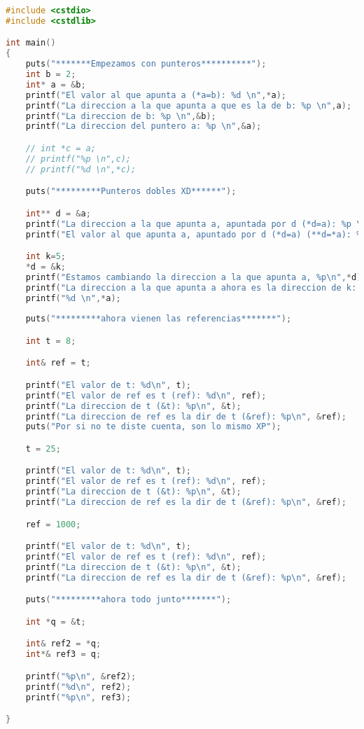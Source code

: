 \begin{lstlisting}[language=C++, caption={Examples ref and pointers}]
#include <cstdio>
#include <cstdlib>

int main()
{
    puts("*******Empezamos con punteros**********");
    int b = 2;
    int* a = &b;
    printf("El valor al que apunta a (*a=b): %d \n",*a);
    printf("La direccion a la que apunta a que es la de b: %p \n",a);
    printf("La direccion de b: %p \n",&b);
    printf("La direccion del puntero a: %p \n",&a);

    // int *c = a;
    // printf("%p \n",c);
    // printf("%d \n",*c);

    puts("*********Punteros dobles XD******");

    int** d = &a;
    printf("La direccion a la que apunta a, apuntada por d (*d=a): %p \n",*d);
    printf("El valor al que apunta a, apuntado por d (*d=a) (**d=*a): %d \n",**d);

    int k=5;
    *d = &k;
    printf("Estamos cambiando la direccion a la que apunta a, %p\n",*d);
    printf("La direccion a la que apunta a ahora es la direccion de k:  %p \n",a);
    printf("%d \n",*a);
    
    puts("*********ahora vienen las referencias*******");

    int t = 8;

    int& ref = t;

    printf("El valor de t: %d\n", t);
    printf("El valor de ref es t (ref): %d\n", ref);
    printf("La direccion de t (&t): %p\n", &t);
    printf("La direccion de ref es la dir de t (&ref): %p\n", &ref);
    puts("Por si no te diste cuenta, son lo mismo XP");

    t = 25;

    printf("El valor de t: %d\n", t);
    printf("El valor de ref es t (ref): %d\n", ref);
    printf("La direccion de t (&t): %p\n", &t);
    printf("La direccion de ref es la dir de t (&ref): %p\n", &ref);

    ref = 1000;

    printf("El valor de t: %d\n", t);
    printf("El valor de ref es t (ref): %d\n", ref);
    printf("La direccion de t (&t): %p\n", &t);
    printf("La direccion de ref es la dir de t (&ref): %p\n", &ref);

    puts("*********ahora todo junto*******");

    int *q = &t;

    int& ref2 = *q;
    int*& ref3 = q;

    printf("%p\n", &ref2);
    printf("%d\n", ref2);
    printf("%p\n", ref3);

}
\end{lstlisting}